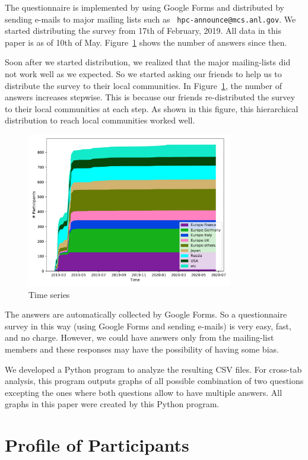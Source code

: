 \documentclass[submit,techrep,noauthor,english]{ipsj}
\begin{document}
The questionnaire is implemented by using Google Forms and distributed
by sending e-mails to major mailing lists such as {\tt
  hpc-announce@mcs.anl.gov}. We started distributing the survey from 17th of
February, 2019. All data in this paper is as of 10th of
May. Figure~\ref{fig:timeseries} shows the number of answers since then.

Soon after we started distribution, we realized that the major
mailing-lists did not work well as we
expected. So we started asking our friends to help us to distribute
the survey to their local communities. In Figure~\ref{fig:timeseries},
the number of answers increases stepwise. This is because our friends
re-distributed the survey to their local communities at each step. As
shown in this figure, this hierarchical distribution to reach local
communities worked well.

\begin{figure}[htb]
\begin{center}
\includegraphics[width=9cm]{../pdfs/TimeSeries.pdf}
\caption{Time series}
\label{fig:timeseries}
\end{center}
\end{figure}

The answers are automatically collected by Google Forms. So a
questionnaire survey in this way (using Google Forms and sending
e-mails) is very easy, fast, and no charge.  However, we could have 
answers only from the mailing-list members and these responses may
have the possibility of having some bias.

We developed a Python program to analyze the resulting CSV files. For
cross-tab analysis, this program outputs graphs of all possible
combination of two questions excepting the ones where both questions
allow to have multiple answers. All graphs in this paper were created
by this Python program. 

\section{Profile of Participants}\label{sec:profile}
\end{document}
